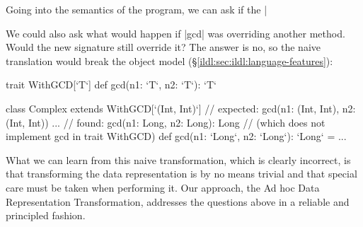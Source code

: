 Going into the semantics of the program, we can ask if the |%

We could also ask what would happen if |gcd| was overriding another method. Would the new signature still override it? The answer is no, so the naive translation would break the object model (\S\ref{ildl:sec:ildl:language-features}):

\begin{lstlisting-nobreak}
trait WithGCD[`T`] {
  def gcd(n1: `T`, n2: `T`): `T`
}

class Complex extends WithGCD[`(Int, Int)`] {
  // expected: gcd(n1: (Int, Int), n2: (Int, Int)) ...
  // found:    gcd(n1: Long, n2: Long): Long
  // (which does not implement gcd in trait WithGCD)
  def gcd(n1: `Long`, n2: `Long`): `Long` = ...
}
\end{lstlisting-nobreak}

What we can learn from this naive transformation, which is clearly incorrect, is that transforming the data representation is by no means trivial and that special care must be taken when performing it. Our approach, the Ad hoc Data Representation Transformation, addresses the questions above in a reliable and principled fashion.

